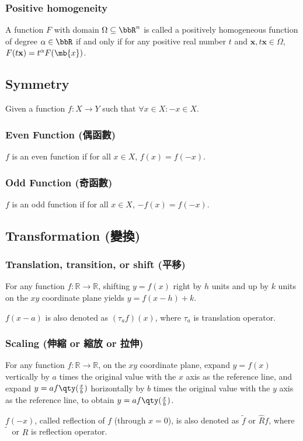 \documentclass[a4paper,12pt]{report}
\begin{document}
\subsubsection{Positive homogeneity}
A function $F$ with domain $\Omega\subseteq\bbR^n$ is called a positively homogeneous function of degree $\alpha\in\bbR$ if and only if for any positive real number $t$ and $\mathbf{x},t\mathbf{x}\in\Omega$, $F(t\mathbf{x})=t^{\alpha}F(\mb{x})$.
\subsection{Symmetry}
Given a function $f\colon X\to Y$ such that $\forall x\in X\colon -x\in X$.
\subsubsection{Even Function (偶函數)}
$f$ is an even function if for all $x\in X$, $f(x)=f(-x)$.
\subsubsection{Odd Function (奇函數)}
$f$ is an odd function if for all $x\in X$, $-f(x)=f(-x)$.
\subsection{Transformation (變換)}
\subsubsection{Translation, transition, or shift (平移)}
For any function $f\colon\mathbb{R}\to\mathbb{R}$, shifting $y=f(x)$ right by $h$ units and up by $k$ units on the $xy$ coordinate plane yields $y=f(x-h)+k$.

$f(x-a)$ is also denoted as $(\tau_af)(x)$, where $\tau_a$ is translation operator.
\subsubsection{Scaling (伸縮 or 縮放 or 拉伸)}
For any function $f\colon\mathbb{R}\to\mathbb{R}$, on the $xy$ coordinate plane, expand $y=f(x)$ vertically by $a$ times the original value with the $x$ axis as the reference line, and expand $y=af\qty(\frac{x}{b})$ horizontally by $b$ times the original value with the $y$ axis as the reference line, to obtain $y=af\qty(\frac{x}{b})$.

$f(-x)$, called reflection of $f$ (through $x=0$), is also denoted as $\tilde{f}$ or $\hat{R}f$, where $\tilde{\phantom{f}}$ or $\hat{R}$ is reflection operator.
\end{document}
